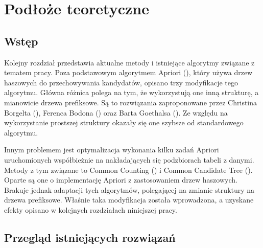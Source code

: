 \chapter{Podłoże teoretyczne}
\label{c3}

\section{Wstęp}
\label{c31}
Kolejny rozdział przedstawia aktualne metody i istniejące algorytmy związane z tematem pracy. Poza podstawowym algorytmem Apriori (\cite{Agrawal}), który używa drzew haszowych do przechowywania kandydatów, opisano trzy modyfikacje tego algorytmu. Główna różnica polega na tym, że wykorzystują one inną strukturę, a mianowicie drzewa prefiksowe. Są to rozwiązania zaproponowane przez Christina Borgelta (\cite{Borgelt}), Ferenca Bodona (\cite{Bodon}) oraz Barta Goethalsa (\cite{Goethals}). Ze względu na wykorzystanie prostszej struktury okazały się one szybsze od standardowego algorytmu.
 
Innym problemem jest optymalizacja wykonania kilku zadań Apriori uruchomionych współbieżnie na nakładających się podzbiorach tabeli z danymi. Metody z tym związane to Common Counting (\cite{WojciechowskiCC}) i Common Candidate Tree (\cite{WojciechowskiCCT}). Oparte są one o implementację Apriori z zastosowaniem drzew haszowych. Brakuje jednak adaptacji tych algorytmów, polegającej na zmianie struktury na drzewa prefiksowe. Właśnie taka modyfikacja została wprowadzona, a uzyskane efekty opisano w kolejnych rozdziałach niniejszej pracy. 


\section{Przegląd istniejących rozwiązań}
\label{c32}

